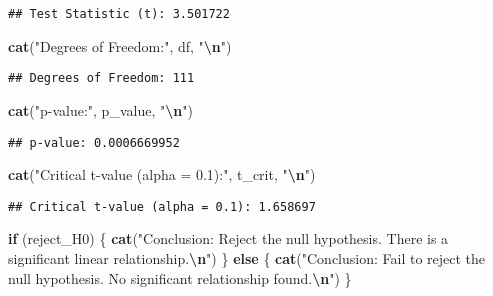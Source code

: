 \documentclass[
]{article}
\newenvironment{Shaded}{\begin{snugshade}}{\end{snugshade}}
\newcommand{\ControlFlowTok}[1]{\textcolor[rgb]{0.13,0.29,0.53}{\textbf{#1}}}
\newcommand{\FunctionTok}[1]{\textcolor[rgb]{0.13,0.29,0.53}{\textbf{#1}}}
\newcommand{\NormalTok}[1]{#1}
\newcommand{\SpecialCharTok}[1]{\textcolor[rgb]{0.81,0.36,0.00}{\textbf{#1}}}
\newcommand{\StringTok}[1]{\textcolor[rgb]{0.31,0.60,0.02}{#1}}
\begin{document}
\begin{verbatim}
## Test Statistic (t): 3.501722
\end{verbatim}

\begin{Shaded}
\begin{Highlighting}[]
\FunctionTok{cat}\NormalTok{(}\StringTok{"Degrees of Freedom:"}\NormalTok{, df, }\StringTok{"}\SpecialCharTok{\textbackslash{}n}\StringTok{"}\NormalTok{)}
\end{Highlighting}
\end{Shaded}

\begin{verbatim}
## Degrees of Freedom: 111
\end{verbatim}

\begin{Shaded}
\begin{Highlighting}[]
\FunctionTok{cat}\NormalTok{(}\StringTok{"p{-}value:"}\NormalTok{, p\_value, }\StringTok{"}\SpecialCharTok{\textbackslash{}n}\StringTok{"}\NormalTok{)}
\end{Highlighting}
\end{Shaded}

\begin{verbatim}
## p-value: 0.0006669952
\end{verbatim}

\begin{Shaded}
\begin{Highlighting}[]
\FunctionTok{cat}\NormalTok{(}\StringTok{"Critical t{-}value (alpha = 0.1):"}\NormalTok{, t\_crit, }\StringTok{"}\SpecialCharTok{\textbackslash{}n}\StringTok{"}\NormalTok{)}
\end{Highlighting}
\end{Shaded}

\begin{verbatim}
## Critical t-value (alpha = 0.1): 1.658697
\end{verbatim}

\begin{Shaded}
\begin{Highlighting}[]
\ControlFlowTok{if}\NormalTok{ (reject\_H0) \{}
  \FunctionTok{cat}\NormalTok{(}\StringTok{"Conclusion: Reject the null hypothesis. There is a significant linear relationship.}\SpecialCharTok{\textbackslash{}n}\StringTok{"}\NormalTok{)}
\NormalTok{\} }\ControlFlowTok{else}\NormalTok{ \{}
  \FunctionTok{cat}\NormalTok{(}\StringTok{"Conclusion: Fail to reject the null hypothesis. No significant relationship found.}\SpecialCharTok{\textbackslash{}n}\StringTok{"}\NormalTok{)}
\NormalTok{\}}
\end{Highlighting}
\end{Shaded}
\end{document}
